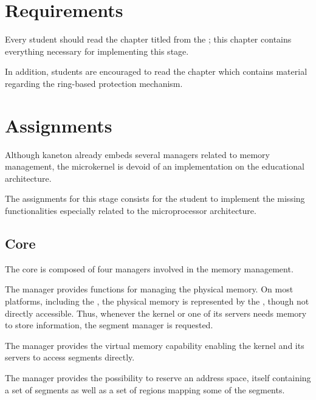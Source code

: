 \newpage

%
%

%
%

\section{Requirements}

Every student should read the chapter titled  from the
; this chapter contains everything necessary for
implementing this stage.

In addition, students are encouraged to read the chapter 
which contains material regarding the  ring-based protection
mechanism.

%
%

\section{Assignments}

Although kaneton already embeds several managers related to memory management,
the microkernel is devoid of an implementation on the  educational
architecture.

The assignments for this stage consists for the student to implement the
missing functionalities especially related to the  microprocessor
architecture.

\subsection{Core}

The core is composed of four managers involved in the memory management.

The  manager provides functions for managing the physical memory.
On most platforms, including the , the physical memory is
represented by the , though not directly
accessible. Thus, whenever the kernel or one of its servers needs memory to
store information, the segment manager is requested.

The  manager provides the virtual memory capability enabling
the kernel and its servers to access segments directly.

The  manager provides the possibility to reserve an address space,
itself containing a set of segments as well as a set of regions mapping some of
the segments.


